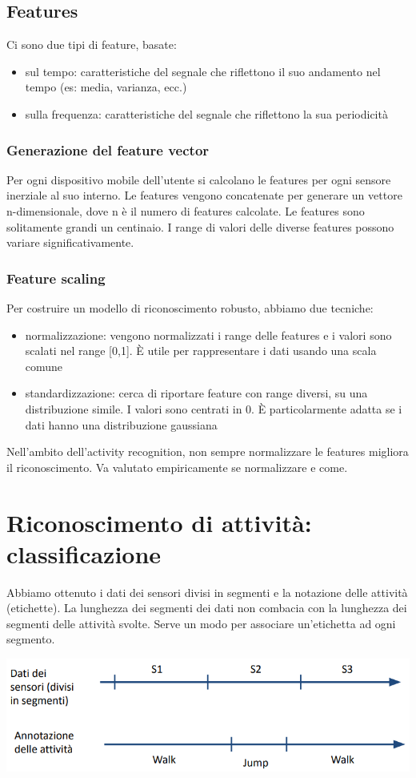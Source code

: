 \subsection{Features}
Ci sono due tipi di feature, basate:
\begin{itemize}
    \item sul tempo: caratteristiche del segnale che riflettono il suo andamento nel tempo (es: media, varianza, ecc.)
    \item sulla frequenza: caratteristiche del segnale che riflettono la sua periodicità
\end{itemize}

\subsubsection{Generazione del feature vector}
Per ogni dispositivo mobile dell'utente si calcolano le features per ogni sensore inerziale al suo interno. Le features vengono concatenate per generare un vettore n-dimensionale, dove n è il numero di features calcolate. Le features sono solitamente grandi un centinaio. I range di valori delle diverse features possono variare significativamente.

\subsubsection{Feature scaling}
Per costruire un modello di riconoscimento robusto, abbiamo due tecniche:
\begin{itemize}
    \item normalizzazione: vengono normalizzati i range delle features e i valori sono scalati nel range [0,1]. È utile per rappresentare i dati usando una scala comune
    \item standardizzazione: cerca di riportare feature con range diversi, su una distribuzione simile. I valori sono centrati in 0. È particolarmente adatta se i dati hanno una distribuzione gaussiana 
\end{itemize}

Nell'ambito dell'activity recognition, non sempre normalizzare le features migliora il riconoscimento. Va valutato empiricamente se normalizzare e come. 

\section{Riconoscimento di attività: classificazione}
Abbiamo ottenuto i dati dei sensori divisi in segmenti e la notazione delle attività (etichette). La lunghezza dei segmenti dei dati non combacia con la lunghezza dei segmenti delle attività svolte. 
Serve un modo per associare un'etichetta ad ogni segmento. 
\begin{center}
    \includegraphics[width=.7\textwidth]{images/MobiDEV/6. activity recognition/labeling dei segmenti.PNG}
\end{center}

